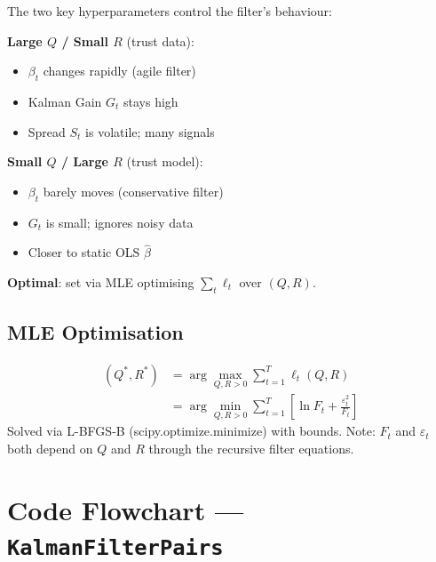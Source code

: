 \documentclass[10pt,a4paper,twocolumn]{article}
\begin{document}
The two key hyperparameters control the filter's behaviour:

\begin{tcolorbox}[notebox={Q/R Intuition}]
\textbf{Large $Q$ / Small $R$} (trust data):
\begin{itemize}\setlength\itemsep{0pt}
  \item $\beta_t$ changes rapidly (agile filter)
  \item Kalman Gain $G_t$ stays high
  \item Spread $S_t$ is volatile; many signals
\end{itemize}
\textbf{Small $Q$ / Large $R$} (trust model):
\begin{itemize}\setlength\itemsep{0pt}
  \item $\beta_t$ barely moves (conservative filter)
  \item $G_t$ is small; ignores noisy data
  \item Closer to static OLS $\hat\beta$
\end{itemize}
\textbf{Optimal}: set via MLE optimising $\sum_t \ell_t$ over $(Q,R)$.
\end{tcolorbox}

\subsection{MLE Optimisation}

\begin{tcolorbox}[mathbox={Formula 9 --- MLE for {Q, R}}]
\vspace{-4pt}
\begin{align}
  (Q^*,R^*) &= \arg\max_{Q,R>0} \sum_{t=1}^T \ell_t(Q,R)\\
  &= \arg\min_{Q,R>0} \sum_{t=1}^T
    \left[\ln F_t + \frac{\varepsilon_t^2}{F_t}\right]
\end{align}
\vspace{-4pt}
Solved via L-BFGS-B (scipy.optimize.minimize) with bounds.
Note: $F_t$ and $\varepsilon_t$ both depend on $Q$ and $R$
through the recursive filter equations.
\end{tcolorbox}

\section{Code Flowchart --- \texttt{KalmanFilterPairs}}
\end{document}
